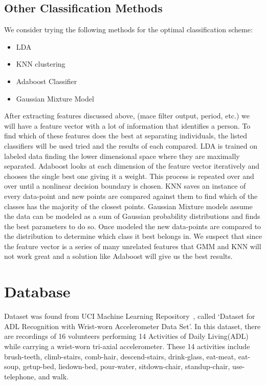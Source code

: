 \documentclass[10pt,twocolumn,letterpaper]{article}
\begin{document}
\subsection{Other Classification Methods}

We consider trying the following methods for the optimal classification scheme:
\begin{itemize}
\item LDA
\item KNN clustering
\item Adaboost Classifier
\item Gaussian Mixture Model

\end{itemize}
After extracting features discussed above, (mace filter output, period, etc.) we will have a feature vector with a lot of information that identifies a person.  To find which of these features does the best at separating individuals, the listed classifiers will be used tried and the results of each compared.  LDA is trained on labeled data finding the lower dimensional space where they are maximally separated.  Adaboost looks at each dimension of the feature vector iteratively and chooses the single best one giving it a weight. This process is repeated over and over until a nonlinear decision boundary is chosen. KNN saves an instance of every data-point and new points are compared against them to find which of the classes has the majority of the closest points.  Gaussian Mixture models assume the data can be modeled as a sum of Gaussian probability distributions and finds the best parameters to do so.  Once modeled the new data-points are compared to the distribution to determine which class it best belongs in.  We suspect that since the feature vector is a series of many unrelated features that GMM and KNN will not work great and a solution like Adaboost will give us the best results.

\section{Database}

Dataset was found from UCI Machine Learning Repository~\cite{Author02}, called ‘Dataset for ADL Recognition with Wrist-worn Accelerometer Data Set’. In this dataset, there are recordings of 16 volunteers performing 14 Activities of Daily Living(ADL) while carrying a wrist-worn tri-axial accelerometer. These 14 activities include brush-teeth, climb-stairs, comb-hair, descend-stairs, drink-glass, eat-meat, eat-soup, getup-bed, liedown-bed, pour-water, sitdown-chair, standup-chair, use-telephone, and walk.
\end{document}
